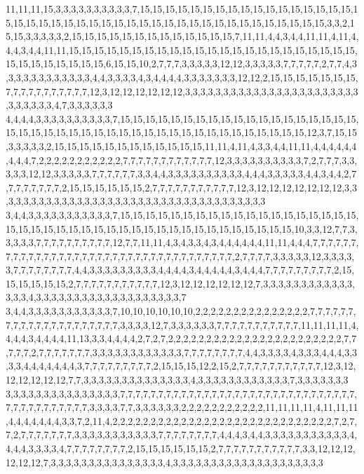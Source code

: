 11,11,11,15,3,3,3,3,3,3,3,3,3,3,7,15,15,15,15,15,15,15,15,15,15,15,15,15,15,15,15,15,15,15,15,15,15,15,15,15,15,15,15,15,15,15,15,15,15,15,15,15,15,15,15,15,15,15,3,3,2,15,15,3,3,3,3,3,2,15,15,15,15,15,15,15,15,15,15,15,15,15,7,11,11,4,4,3,4,4,11,11,4,11,4,4,4,3,4,4,11,11,15,15,15,15,15,15,15,15,15,15,15,15,15,15,15,15,15,15,15,15,15,15,15,15,15,15,15,15,15,15,15,6,15,15,10,2,7,7,7,3,3,3,3,3,12,12,3,3,3,3,3,7,7,7,7,7,2,7,7,4,3,3,3,3,3,3,3,3,3,3,3,3,4,4,3,3,3,3,4,3,4,4,4,4,3,3,3,3,3,3,3,12,12,2,15,15,15,15,15,15,15,7,7,7,7,7,7,7,7,7,7,7,12,3,12,12,12,12,12,12,3,3,3,3,3,3,3,3,3,3,3,3,3,3,3,3,3,3,3,3,3,3,3,3,3,3,3,3,3,4,7,3,3,3,3,3,3
4,4,4,4,3,3,3,3,3,3,3,3,3,3,7,15,15,15,15,15,15,15,15,15,15,15,15,15,15,15,15,15,15,15,15,15,15,15,15,15,15,15,15,15,15,15,15,15,15,15,15,15,15,15,15,15,15,15,12,3,7,15,15,3,3,3,3,3,2,15,15,15,15,15,15,15,15,15,15,15,15,11,11,4,11,4,3,3,4,4,11,11,4,4,4,4,4,4,4,4,4,7,2,2,2,2,2,2,2,2,2,2,2,7,7,7,7,7,7,7,7,7,7,7,7,12,3,3,3,3,3,3,3,3,3,3,7,2,7,7,7,3,3,3,3,3,12,12,3,3,3,3,3,7,7,7,7,7,7,3,3,4,4,3,3,3,3,3,3,3,3,3,3,4,4,4,3,3,3,3,3,4,4,3,4,4,2,7,7,7,7,7,7,7,7,2,15,15,15,15,15,15,2,7,7,7,7,7,7,7,7,7,7,7,12,3,12,12,12,12,12,12,12,3,3,3,3,3,3,3,3,3,3,3,3,3,3,3,3,3,3,3,3,3,3,3,3,3,3,3,3,3,3,3,3,3,3,3,3
3,4,4,3,3,3,3,3,3,3,3,3,3,3,7,15,15,15,15,15,15,15,15,15,15,15,15,15,15,15,15,15,15,15,15,15,15,15,15,15,15,15,15,15,15,15,15,15,15,15,15,15,15,15,15,15,15,10,3,3,12,7,7,3,3,3,3,3,7,7,7,7,7,7,7,7,7,7,12,7,7,11,11,4,3,4,3,3,4,3,4,4,4,4,4,4,11,11,4,4,4,7,7,7,7,7,7,7,7,7,7,7,7,7,7,7,7,7,7,7,7,7,7,7,7,7,7,7,7,7,7,7,7,7,7,7,7,2,7,7,7,7,3,3,3,3,3,12,3,3,3,3,3,7,7,7,7,7,7,7,7,4,4,3,3,3,3,3,3,3,3,3,4,4,4,4,3,4,4,4,4,4,3,4,4,4,7,7,7,7,7,7,7,7,7,2,15,15,15,15,15,15,2,7,7,7,7,7,7,7,7,7,7,7,12,3,12,12,12,12,12,12,7,3,3,3,3,3,3,3,3,3,3,3,3,3,3,3,4,3,3,3,3,3,3,3,3,3,3,3,3,3,3,3,3,3,3,3,7
3,4,4,3,3,3,3,3,3,3,3,3,3,3,7,10,10,10,10,10,10,2,2,2,2,2,2,2,2,2,2,2,2,2,2,2,7,7,7,7,7,7,7,7,7,7,7,7,7,7,7,7,7,7,7,7,7,3,3,3,3,12,7,3,3,3,3,3,3,7,7,7,7,7,7,7,7,7,7,7,11,11,11,11,4,4,4,4,3,4,4,4,4,11,13,3,3,4,4,4,4,2,7,2,7,2,2,2,2,2,2,2,2,2,2,2,2,2,2,2,2,2,2,2,2,2,2,2,7,7,7,7,7,2,7,7,7,7,7,7,7,3,3,3,3,3,3,3,3,3,3,3,3,7,7,7,7,7,7,7,7,4,4,3,3,3,3,4,3,3,3,4,4,4,3,3,3,3,4,4,4,4,4,4,4,3,7,7,7,7,7,7,7,7,7,2,15,15,15,12,2,15,2,7,7,7,7,7,7,7,7,7,7,7,12,3,12,12,12,12,12,12,7,7,3,3,3,3,3,3,3,3,3,3,3,3,3,3,4,3,3,3,3,3,3,3,3,3,3,3,3,7,3,3,3,3,3,3,3
3,3,3,3,3,3,3,3,3,3,3,3,3,3,3,7,7,7,7,7,7,7,7,7,7,7,7,7,7,7,7,7,7,7,7,7,7,7,7,7,7,7,7,7,7,7,7,7,7,7,7,7,7,7,7,7,7,3,3,3,3,7,7,3,3,3,3,3,3,2,2,2,2,2,2,2,2,2,2,2,11,11,11,11,4,11,11,11,4,4,4,4,4,4,4,3,3,7,2,11,4,2,2,2,2,2,2,2,2,2,2,2,2,2,2,2,2,2,2,2,2,2,2,2,2,2,2,2,2,2,7,2,7,7,2,7,7,7,7,7,7,7,3,3,3,3,3,3,3,3,3,3,3,7,7,7,7,7,7,7,7,4,4,4,3,4,4,3,3,3,3,3,3,3,3,3,3,3,4,4,4,4,3,3,3,3,4,7,7,7,7,7,7,7,7,2,15,15,15,15,15,15,2,7,7,7,7,7,7,7,7,7,7,7,3,3,12,12,12,12,12,12,7,3,3,3,3,3,3,3,3,3,3,3,3,3,3,3,4,3,3,3,3,3,3,3,3,3,3,3,3,3,3,3,3,3,3,3,3
